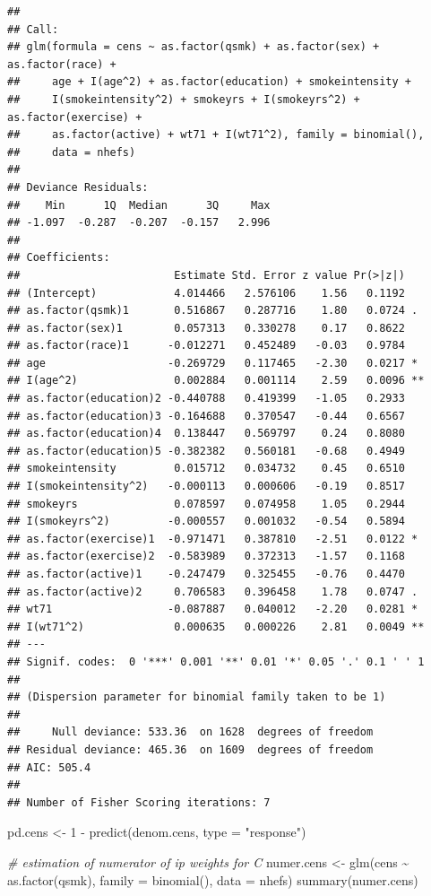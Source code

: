 \documentclass[
  10pt,
]{book}
\newenvironment{Shaded}{\begin{snugshade}}{\end{snugshade}}
\newcommand{\AttributeTok}[1]{\textcolor[rgb]{0.77,0.63,0.00}{#1}}
\newcommand{\CommentTok}[1]{\textcolor[rgb]{0.56,0.35,0.01}{\textit{#1}}}
\newcommand{\DecValTok}[1]{\textcolor[rgb]{0.00,0.00,0.81}{#1}}
\newcommand{\FunctionTok}[1]{\textcolor[rgb]{0.00,0.00,0.00}{#1}}
\newcommand{\NormalTok}[1]{#1}
\newcommand{\OtherTok}[1]{\textcolor[rgb]{0.56,0.35,0.01}{#1}}
\newcommand{\SpecialCharTok}[1]{\textcolor[rgb]{0.00,0.00,0.00}{#1}}
\newcommand{\StringTok}[1]{\textcolor[rgb]{0.31,0.60,0.02}{#1}}
\begin{document}
\begin{verbatim}
## 
## Call:
## glm(formula = cens ~ as.factor(qsmk) + as.factor(sex) + as.factor(race) + 
##     age + I(age^2) + as.factor(education) + smokeintensity + 
##     I(smokeintensity^2) + smokeyrs + I(smokeyrs^2) + as.factor(exercise) + 
##     as.factor(active) + wt71 + I(wt71^2), family = binomial(), 
##     data = nhefs)
## 
## Deviance Residuals: 
##    Min      1Q  Median      3Q     Max  
## -1.097  -0.287  -0.207  -0.157   2.996  
## 
## Coefficients:
##                        Estimate Std. Error z value Pr(>|z|)   
## (Intercept)            4.014466   2.576106    1.56   0.1192   
## as.factor(qsmk)1       0.516867   0.287716    1.80   0.0724 . 
## as.factor(sex)1        0.057313   0.330278    0.17   0.8622   
## as.factor(race)1      -0.012271   0.452489   -0.03   0.9784   
## age                   -0.269729   0.117465   -2.30   0.0217 * 
## I(age^2)               0.002884   0.001114    2.59   0.0096 **
## as.factor(education)2 -0.440788   0.419399   -1.05   0.2933   
## as.factor(education)3 -0.164688   0.370547   -0.44   0.6567   
## as.factor(education)4  0.138447   0.569797    0.24   0.8080   
## as.factor(education)5 -0.382382   0.560181   -0.68   0.4949   
## smokeintensity         0.015712   0.034732    0.45   0.6510   
## I(smokeintensity^2)   -0.000113   0.000606   -0.19   0.8517   
## smokeyrs               0.078597   0.074958    1.05   0.2944   
## I(smokeyrs^2)         -0.000557   0.001032   -0.54   0.5894   
## as.factor(exercise)1  -0.971471   0.387810   -2.51   0.0122 * 
## as.factor(exercise)2  -0.583989   0.372313   -1.57   0.1168   
## as.factor(active)1    -0.247479   0.325455   -0.76   0.4470   
## as.factor(active)2     0.706583   0.396458    1.78   0.0747 . 
## wt71                  -0.087887   0.040012   -2.20   0.0281 * 
## I(wt71^2)              0.000635   0.000226    2.81   0.0049 **
## ---
## Signif. codes:  0 '***' 0.001 '**' 0.01 '*' 0.05 '.' 0.1 ' ' 1
## 
## (Dispersion parameter for binomial family taken to be 1)
## 
##     Null deviance: 533.36  on 1628  degrees of freedom
## Residual deviance: 465.36  on 1609  degrees of freedom
## AIC: 505.4
## 
## Number of Fisher Scoring iterations: 7
\end{verbatim}

\begin{Shaded}
\begin{Highlighting}[]
\NormalTok{pd.cens }\OtherTok{\textless{}{-}} \DecValTok{1} \SpecialCharTok{{-}} \FunctionTok{predict}\NormalTok{(denom.cens, }\AttributeTok{type =} \StringTok{"response"}\NormalTok{)}

\CommentTok{\# estimation of numerator of ip weights for C}
\NormalTok{numer.cens }\OtherTok{\textless{}{-}}
  \FunctionTok{glm}\NormalTok{(cens }\SpecialCharTok{\textasciitilde{}} \FunctionTok{as.factor}\NormalTok{(qsmk), }\AttributeTok{family =} \FunctionTok{binomial}\NormalTok{(), }\AttributeTok{data =}\NormalTok{ nhefs)}
\FunctionTok{summary}\NormalTok{(numer.cens)}
\end{Highlighting}
\end{Shaded}
\end{document}
